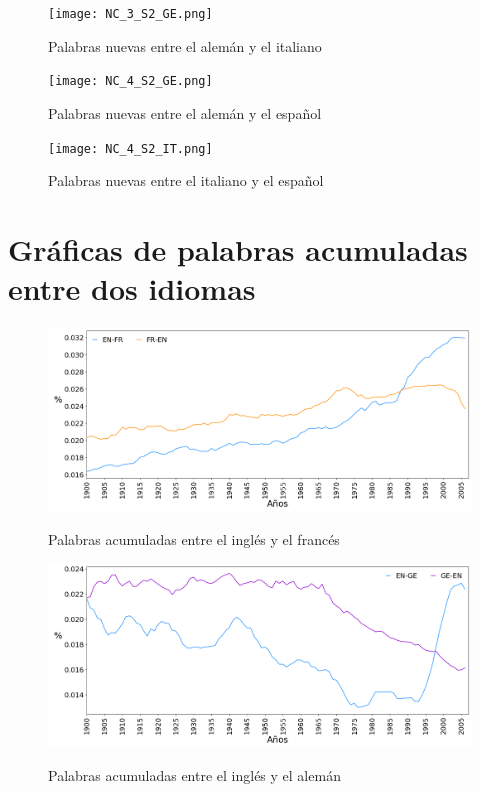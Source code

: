 \begin{figure}[h!]
	\centering
	\texttt{[image: NC\_3\_S2\_GE.png]}
	\label{fig.NC_GI}
	\caption{Palabras nuevas entre el alemán y el italiano}
\end{figure}

\begin{figure}[h!]
	\centering
	\texttt{[image: NC\_4\_S2\_GE.png]}
	\label{fig.NC_GS}
	\caption{Palabras nuevas entre el alemán y el español}
\end{figure}

\begin{figure}[h!]
	\centering
	\texttt{[image: NC\_4\_S2\_IT.png]}
	\label{fig.NC_IS}
	\caption{Palabras nuevas entre el italiano y el español}
\end{figure}





\clearpage



\section{Gráficas de palabras acumuladas entre dos idiomas}

\begin{figure}[h!]
	\centering
	\includegraphics[scale=.38]{Cap_4/SF_1_S2_EN.png}
	\label{fig.SF_EF}
	\caption{Palabras acumuladas entre el inglés y el francés}
\end{figure}


\begin{figure}[h!]
	\centering
	\includegraphics[scale=.38]{Cap_4/SF_2_S2_EN.png}
	\label{fig.SF_EG}
	\caption{Palabras acumuladas entre el inglés y el alemán}
\end{figure}


